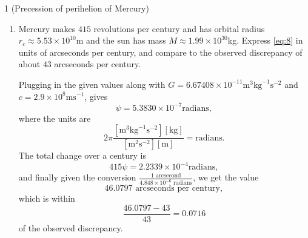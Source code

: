 \documentclass[11pt]{article}
\begin{document}
\begin{problem}{1 (Precession of perihelion of Mercury)}
\begin{enumerate}[label=(\alph*)]
\begin{proof}
			      At this point, we note that \( c^2 r_c \gg 6GM \), that is, \( 6GM/c^2r_c \ll 1 \).
			      We can hence use the binomial expansion to write that, to first order,
			      \begin{equation}
				      \label{eq:36}
				      \psi = 2\pi \left( 1 + \frac{1}{2} \frac{6GM}{c^2 r_{c}} - 1 \right) = \frac{6\pi GM}{c^2 r_c}.
			      \end{equation}
		      \end{proof}
		\item Mercury makes \( 415 \) revolutions per century and has orbital radius \( r_c \approx 5.53 \times 10^{10} \)m and the sun has mass \( M \approx 1.99 \times 10^{30} \)kg.
		      Express \cref{eq:8} in units of arcseconds per century, and compare to the observed discrepancy of about \( 43 \) arcseconds per century.
		      \begin{answer}
			      Plugging in the given values along with \( G = 6.67408 \times 10^{-11} \text{m}^3 \text{kg}^{-1} \text{s}^{-2} \) and \( c = 2.9 \times 10^8 \text{m} \text{s}^{-1} \), gives
			      \begin{equation}
				      \label{eq:37}
				      \psi = 5.3830 \times 10^{-7} \text{radians},
			      \end{equation}
			      where the units are
			      \begin{equation}
				      \label{eq:38}
				      2\pi \frac{ [\text{m}^3 \text{kg}^{-1} \text{s}^{-2}][ \text{kg} ] }{[ \text{m}^2 \text{s}^{-2} ][ \text{m} ]} = \text{radians}.
			      \end{equation}
			      The total change over a century is
			      \begin{equation}
				      \label{eq:39}
				      415 \psi = 2.2339 \times 10^{-4} \text{radians},
			      \end{equation}
			      and finally given the conversion \( \frac{1 \text{ arcsecond}}{4.848 \times 10^{-6} \text{ radians}} \), we get the value
			      \begin{equation}
				      \label{eq:40}
				      46.0797 \text{ arcseconds per century},
			      \end{equation}
			      which is within
			      \begin{equation}
				      \label{eq:41}
				      \frac{46.0797 - 43}{43} = 0.0716
			      \end{equation}
			      of the observed discrepancy.
		      \end{answer}
	\end{enumerate}
\end{problem}
\end{document}
